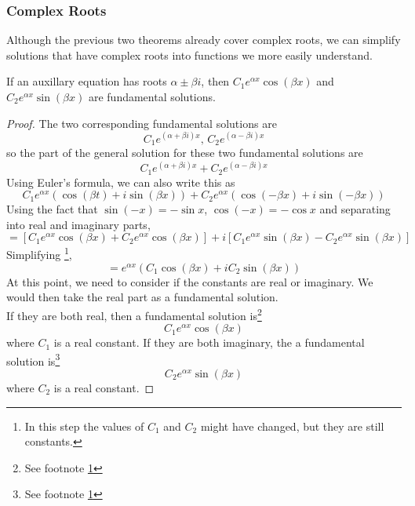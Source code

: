 \subsubsection{Complex Roots}
\noindent
Although the previous two theorems already cover complex roots, we can simplify solutions that have complex roots into functions we more easily understand.\\

\begin{theorem}
	If an auxillary equation has roots $\alpha \pm \beta i$, then $C_1e^{\alpha x}\cos{(\beta x)}$ and  $C_2e^{\alpha x}\sin{(\beta x)}$ are fundamental solutions.
\end{theorem}
\begin{proof}
	The two corresponding fundamental solutions are
	\begin{equation*}
		C_1e^{(\alpha + \beta i)x} \text{, } C_2e^{(\alpha - \beta i)x}
	\end{equation*}
	so the part of the general solution for these two fundamental solutions are
	\begin{equation*}
		C_1e^{(\alpha + \beta i)x} + C_2e^{(\alpha - \beta i)x}
	\end{equation*}
	Using Euler's formula, we can also write this as
	\begin{equation*}
		C_1 e^{\alpha x}\left( \cos{(\beta t)} + i\sin{(\beta x)} \right) + C_2e^{\alpha x}\left( \cos{(-\beta x)} + i\sin{(-\beta x)} \right)
	\end{equation*}
	Using the fact that $\sin{(-x)} = -\sin{x}$, $\cos{(-x)} = -\cos{x}$ and separating into real and imaginary parts,
	\begin{equation*}
		 = \left[ C_1e^{\alpha x}\cos{(\beta x)} + C_2e^{\alpha x}\cos{(\beta x)} \right] + i\left[ C_1e^{\alpha x}\sin{(\beta x)} - C_2e^{\alpha x}\sin{(\beta x)} \right]
	\end{equation*}
	Simplifying \footnote{\label{note1}In this step the values of $C_1$ and $C_2$ might have changed, but they are still constants.},
	\begin{equation*}
		= e^{\alpha x}\left(C_1\cos{(\beta x)} + iC_2\sin{(\beta x)}\right)
	\end{equation*}
	At this point, we need to consider if the constants are real or imaginary. We would then take the real part as a fundamental solution.\\
	If they are both real, then a fundamental solution is\footnote{See footnote \ref{note1}}
	\begin{equation*}
		C_1e^{\alpha x}\cos{(\beta x)}
	\end{equation*}
	where $C_1$ is a real constant.
	If they are both imaginary, the a fundamental solution is\footnote{See footnote \ref{note1}}
	\begin{equation*}
		C_2e^{\alpha x}\sin{(\beta x)}
	\end{equation*}
	where $C_2$ is a real constant.
\end{proof}

